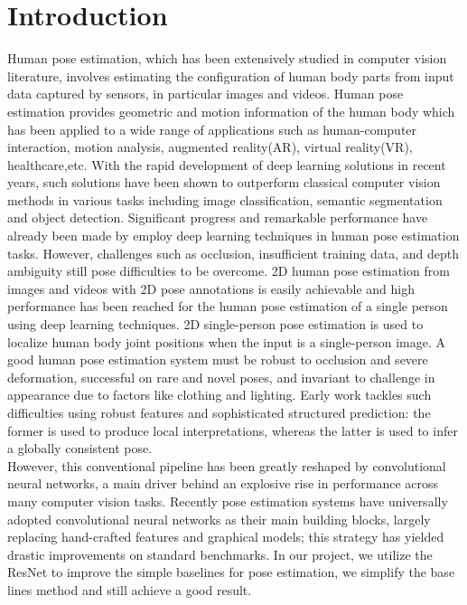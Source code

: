 \documentclass[final]{cvpr}
\begin{document}
\section{Introduction}
Human pose estimation, which has been extensively studied in computer vision literature, involves estimating the configuration of human body parts from input data captured by sensors, in particular images and videos. Human pose estimation provides geometric and motion information of the human body which has been applied to a wide range of applications such as human-computer interaction, motion analysis, augmented reality(AR), virtual reality(VR), healthcare,etc. With the rapid development of deep learning solutions in recent years, such solutions have been shown to outperform classical computer vision methods in various tasks including image classification, semantic segmentation and object detection. Significant progress and remarkable performance have already been made by employ deep learning techniques in human pose estimation tasks. However, challenges such as occlusion, insufficient training data, and depth ambiguity still pose difficulties to be overcome. 2D human pose estimation from images and videos with 2D pose annotations is easily achievable and high performance has been reached for the human pose estimation of a single person using deep learning techniques. 2D single-person pose estimation is used to localize human body joint positions when the input is a single-person image. A good human pose estimation system must be robust to occlusion and severe deformation, successful on rare and novel poses, and invariant to challenge in appearance due to factors like clothing and lighting. Early work tackles such difficulties using robust features and sophisticated structured prediction: the former is used to produce local interpretations, whereas the latter is used to infer a globally consistent pose.\\
\indent However, this conventional pipeline has been greatly reshaped by convolutional neural networks\cite{lecun1998gradient}, a main driver behind an explosive rise in performance across many computer vision tasks. Recently pose estimation\cite{tompson2014joint} systems have universally adopted convolutional neural networks as their main building blocks, largely replacing hand-crafted features and graphical models; this strategy has yielded drastic improvements on standard benchmarks. In our project, we utilize the ResNet\cite{he2016deep} to improve the simple baselines for pose estimation\cite{xiao2018simple}, we simplify the base lines method and still achieve a good result.
\end{document}
